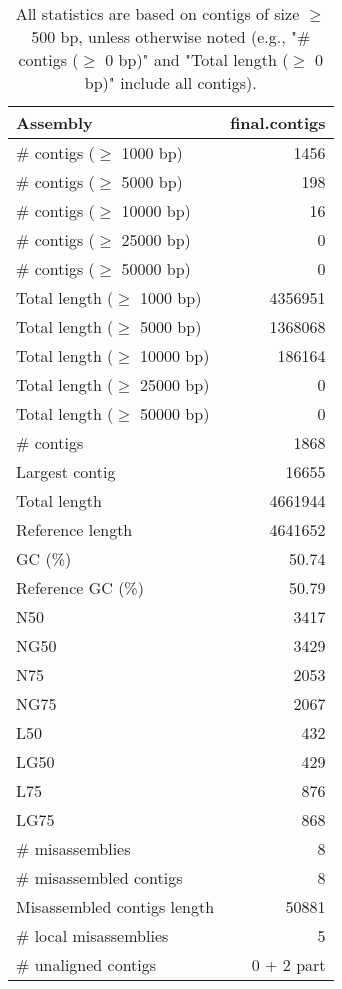 \documentclass[12pt,a4paper]{article}
\begin{document}
\begin{table}[ht]
\begin{center}
\caption{All statistics are based on contigs of size $\geq$ 500 bp, unless otherwise noted (e.g., "\# contigs ($\geq$ 0 bp)" and "Total length ($\geq$ 0 bp)" include all contigs).}
\begin{tabular}{|l*{1}{|r}|}
\hline
Assembly & final.contigs \\ \hline
\# contigs ($\geq$ 1000 bp) & 1456 \\ \hline
\# contigs ($\geq$ 5000 bp) & 198 \\ \hline
\# contigs ($\geq$ 10000 bp) & 16 \\ \hline
\# contigs ($\geq$ 25000 bp) & 0 \\ \hline
\# contigs ($\geq$ 50000 bp) & 0 \\ \hline
Total length ($\geq$ 1000 bp) & 4356951 \\ \hline
Total length ($\geq$ 5000 bp) & 1368068 \\ \hline
Total length ($\geq$ 10000 bp) & 186164 \\ \hline
Total length ($\geq$ 25000 bp) & 0 \\ \hline
Total length ($\geq$ 50000 bp) & 0 \\ \hline
\# contigs & 1868 \\ \hline
Largest contig & 16655 \\ \hline
Total length & 4661944 \\ \hline
Reference length & 4641652 \\ \hline
GC (\%) & 50.74 \\ \hline
Reference GC (\%) & 50.79 \\ \hline
N50 & 3417 \\ \hline
NG50 & 3429 \\ \hline
N75 & 2053 \\ \hline
NG75 & 2067 \\ \hline
L50 & 432 \\ \hline
LG50 & 429 \\ \hline
L75 & 876 \\ \hline
LG75 & 868 \\ \hline
\# misassemblies & 8 \\ \hline
\# misassembled contigs & 8 \\ \hline
Misassembled contigs length & 50881 \\ \hline
\# local misassemblies & 5 \\ \hline
\# unaligned contigs & 0 + 2 part \\ \hline

\end{tabular}
\end{center}
\end{table}
\end{document}
